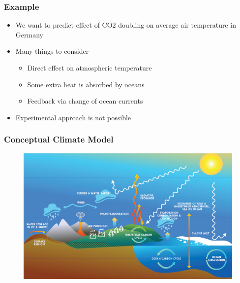 \documentclass[11pt]{beamer}
\begin{document}
\begin{frame}[c]\frametitle{Example}
    \begin{itemize}
        \item We want to predict effect of CO2 doubling on average air temperature in Germany
        \item Many things to consider
        \begin{itemize}
            \item Direct effect on atmospheric temperature
            \item Some extra heat is absorbed by oceans
            \item Feedback via change of ocean currents
        \end{itemize}
        \item Experimental approach is not possible
    \end{itemize}
\end{frame}


\begin{frame}[c]\frametitle{Conceptual Climate Model}
    \begin{figure}
        \includegraphics[width=\textwidth]{figures/climate_mechanisms.png}
    \end{figure}
\end{frame}
\end{document}

